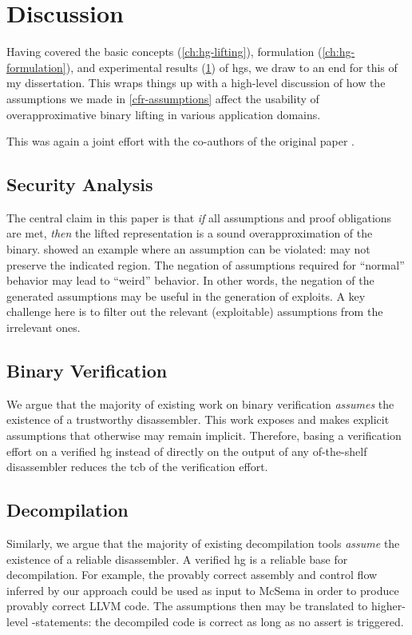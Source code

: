 \chapter{Discussion}\label{ch:hg-discussion}
Having covered the basic concepts (\cref{ch:hg-lifting}), formulation (\cref{ch:hg-formulation}), and experimental results (\cref{ch:hg-discussion}) of \acp{hg}, we draw to an end for this   of my dissertation.
This  wraps things up with a high-level discussion of how the assumptions we made in \cref{cfr-assumptions} affect the usability of overapproximative binary lifting in various application domains.

This  was again a joint effort with the co-authors of the original paper \autocite{verbeek2022lifting}.


\section{Security Analysis}
The central claim in this paper is that \emph{if} all assumptions and proof obligations are met,
\emph{then} the lifted representation is a sound overapproximation of the binary.
 showed an example where an assumption can be violated:  may not preserve the indicated region.
The negation of assumptions required for ``normal'' behavior may lead to ``weird'' behavior.
In other words, the negation of the generated assumptions may be useful in the generation of exploits.
A key challenge here is to filter out the relevant (exploitable) assumptions from the irrelevant ones.

\section{Binary Verification}
We argue that the majority of existing work on binary verification \emph{assumes} the existence of a trustworthy disassembler.
This work exposes and makes explicit assumptions that otherwise may remain implicit.
Therefore, basing a verification effort on a verified \ac{hg} instead of directly on the output of any of-the-shelf disassembler reduces the \ac{tcb} of the verification effort.

\section{Decompilation}
Similarly, we argue that the majority of existing decompilation tools \emph{assume} the existence of a reliable disassembler.
A verified \ac{hg} is a reliable base for decompilation.
For example, the provably correct assembly and control flow inferred by our approach could be used as input to McSema \autocite{dinaburg2014mcsema} in order to produce provably correct LLVM code.
The assumptions then may be translated to higher-level -statements: the decompiled code is correct as long as no assert is triggered.

